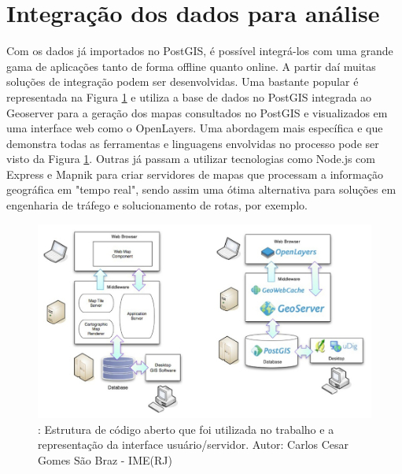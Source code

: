 	\section{Integração dos dados para análise}
	
	Com os dados já importados no PostGIS, é possível integrá-los com uma grande gama de aplicações tanto de forma offline quanto online. A partir daí muitas soluções de integração podem ser desenvolvidas. Uma bastante popular é representada na Figura \ref{fig:estruturaopensource} e utiliza a base de dados no PostGIS integrada ao Geoserver para a geração dos mapas consultados no PostGIS e visualizados em uma interface web como o OpenLayers. Uma abordagem mais específica e que demonstra todas as ferramentas e linguagens envolvidas no processo pode ser visto da Figura \ref{fig:estruturaopensource}. Outras já passam a utilizar tecnologias como Node.js com Express e Mapnik para criar servidores de mapas que processam a informação geográfica em "tempo real", sendo assim uma ótima alternativa para soluções em engenharia de tráfego e solucionamento de rotas, por exemplo.
	
	\begin{figure}
		\centering
		\includegraphics[width=1\linewidth]{data/estrutura_opensource}
		\caption{: Estrutura de código aberto que foi utilizada no trabalho e a representação da interface usuário/servidor. Autor: Carlos Cesar Gomes São Braz - IME(RJ)}
		\label{fig:estruturaopensource}
	\end{figure}

\newpage
	
